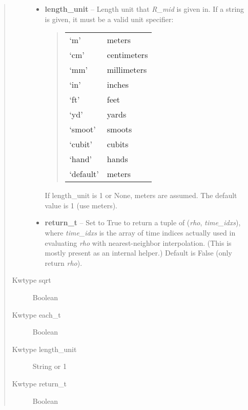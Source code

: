 \documentclass[letterpaper,10pt,english]{sphinxmanual}
\begin{document}
\begin{fulllineitems}
\begin{fulllineitems}
\begin{quote}
\begin{description}
\begin{itemize}
\item {} 
\textbf{length\_unit} -- 
Length unit that \emph{R\_mid} is given in.
If a string is given, it must be a valid unit specifier:
\begin{quote}

\begin{tabulary}{\linewidth}{|L|L|}
\hline

`m'
 & 
meters
\\

`cm'
 & 
centimeters
\\

`mm'
 & 
millimeters
\\

`in'
 & 
inches
\\

`ft'
 & 
feet
\\

`yd'
 & 
yards
\\

`smoot'
 & 
smoots
\\

`cubit'
 & 
cubits
\\

`hand'
 & 
hands
\\

`default'
 & 
meters
\\
\hline\end{tabulary}

\end{quote}

If length\_unit is 1 or None, meters are assumed. The default
value is 1 (use meters).


\item {} 
\textbf{return\_t} -- Set to True to return a tuple of (\emph{rho},
\emph{time\_idxs}), where \emph{time\_idxs} is the array of time indices
actually used in evaluating \emph{rho} with nearest-neighbor
interpolation. (This is mostly present as an internal helper.)
Default is False (only return \emph{rho}).

\end{itemize}

\item[{Kwtype sqrt}] \leavevmode
Boolean

\item[{Kwtype each\_t}] \leavevmode
Boolean

\item[{Kwtype length\_unit}] \leavevmode
String or 1

\item[{Kwtype return\_t}] \leavevmode
Boolean


\end{description}
\end{quote}
\end{fulllineitems}
\end{fulllineitems}
\end{document}
